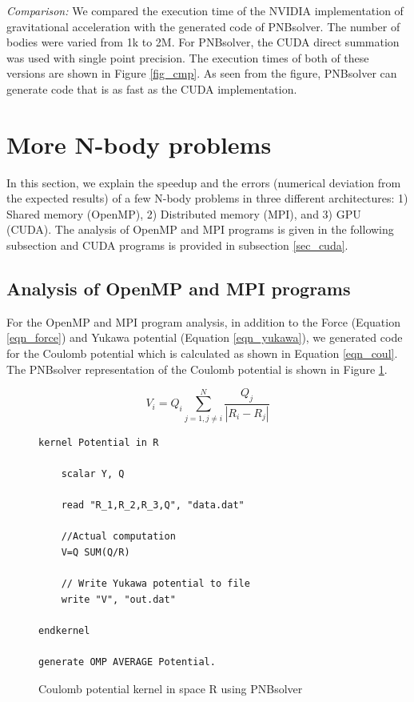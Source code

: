 \documentclass[draftclsnofoot]{elsarticle}
\begin{document}
\textit{Comparison: }
We compared the execution time of the NVIDIA implementation of gravitational acceleration with the generated code of PNBsolver. The number of bodies were varied from 1k to
2M. For PNBsolver, the CUDA direct summation was used with single point precision. The execution times of both of these versions are shown in Figure \ref{fig_cmp}. 
As seen from the figure, PNBsolver can generate code that is as fast as the CUDA implementation. 












\section{More N-body problems}
\label{sec_more}

In this section, we explain the speedup and the errors (numerical deviation from the expected results) of a few N-body problems in three different architectures: 1) Shared memory (OpenMP), 
2) Distributed memory (MPI),  and 3) GPU (CUDA). The analysis of OpenMP and MPI programs is given in the following subsection and CUDA programs is provided in 
subsection \ref{sec_cuda}.

\subsection{Analysis of OpenMP and MPI programs}
For the OpenMP and MPI program analysis, in addition to the Force (Equation \ref{eqn_force}) and  Yukawa potential (Equation \ref{eqn_yukawa}), we generated code for the 
Coulomb potential which is calculated as shown in Equation \ref{eqn_coul}. The PNBsolver representation of the Coulomb potential is shown in Figure \ref{fig_coul}. 

\begin{equation}
\label{eqn_coul}
V_i=Q_i \sum \limits_{j=1, j \ne i}^{N} \frac{Q_j}{|R_i- R_j|} 
\end{equation}

\begin{figure}[!t]
\centering
\begin{lstlisting}[style=AMMA, language=PNB]
kernel Potential in R

	scalar Y, Q
	
	read "R_1,R_2,R_3,Q", "data.dat"

	//Actual computation
	V=Q SUM(Q/R)

	// Write Yukawa potential to file 
	write "V", "out.dat"
	
endkernel

generate OMP AVERAGE Potential. 
\end{lstlisting}
\caption{Coulomb potential kernel in space R using PNBsolver}
\label{fig_coul}
\end{figure}
\end{document}
